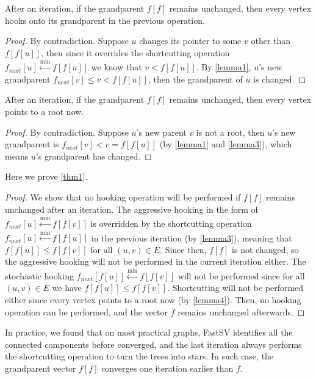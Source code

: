 \documentclass{sokendai_thesis} %
\begin{document}
\begin{lemma}\label{lemma3}
After an iteration, if the grandparent $f[f]$ remains unchanged, then every vertex hooks onto its grandparent in the previous operation.
\end{lemma}

\begin{proof}
By contradiction.
Suppose $u$ changes its pointer to some $v$ other than $f[f[u]]$, then since it overrides the shortcutting operation $f_{\mathit{next}}[u]\xleftarrow{\min}f[f[u]]$ we know that $v<f[f[u]]$.
By \cref{lemma1}, $u$'s new grandparent $f_{\mathit{next}}[v]\leq v<f[f[u]]$, then the grandparent of $u$ is changed.
\end{proof}

\begin{lemma}\label{lemma4}
After an iteration, if the grandparent $f[f]$ remains unchanged, then every vertex points to a root now.
\end{lemma}

\begin{proof}
By contradiction.
Suppose $u$'s new parent $v$ is not a root, then $u$'s new grandparent is $f_{\mathit{next}}[v]<v=f[f[u]]$ (by \cref{lemma1} and \cref{lemma3}), which means $u$'s grandparent has changed.
\end{proof}

Here we prove \cref{thm1}.

\begin{proof}
We show that no hooking operation will be performed if $f[f]$ remains unchanged after an iteration.
The aggressive hooking in the form of $f_{\mathit{next}}[u]\xleftarrow{\min}f[f[v]]$ is overridden by the shortcutting operation $f_{\mathit{next}}[u]\xleftarrow{\min}f[f[u]]$ in the previous iteration (by \cref{lemma3}), meaning that $f[f[u]]\leq f[f[v]]$ for all $(u,v)\in E$.
Since then, $f[f]$ is not changed, so the aggressive hooking will not be performed in the current iteration either.
The stochastic hooking $f_{\mathit{next}}[f[u]]\xleftarrow{\min}f[f[v]]$ will not be performed since for all $(u,v)\in E$ we have $f[f[u]]\leq f[f[v]]$.
Shortcutting will not be performed either since every vertex points to a root now (by \cref{lemma4}).
Then, no hooking operation can be performed, and the vector $f$ remains unchanged afterwards.
\end{proof}

In practice, we found that on most practical graphs, FastSV identifies all the connected components before converged, and the last iteration always performs the shortcutting operation to turn the trees into stars.
In such case, the grandparent vector $f[f]$ converges one iteration earlier than $f$.
\end{document}
